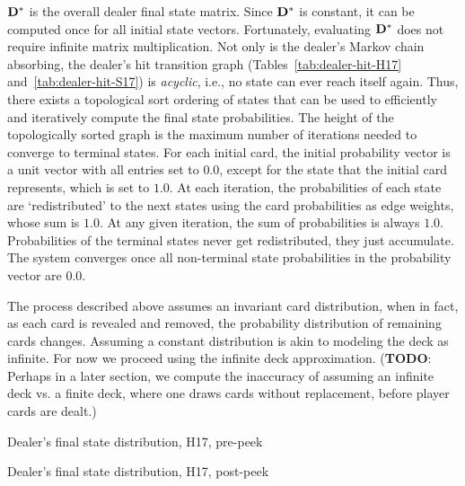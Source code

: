 
$\mathbf{D^*}$ is the overall dealer final state matrix.  
Since $\mathbf{D^*}$ is constant, it can be computed once
for all initial state vectors.
Fortunately, evaluating $\mathbf{D^*}$ does not require infinite 
matrix multiplication.
Not only is the dealer's Markov chain absorbing, 
the dealer's hit transition graph
(Tables~\ref{tab:dealer-hit-H17} and~\ref{tab:dealer-hit-S17})
is \emph{acyclic}, i.e., no state can ever reach itself again.  
Thus, there exists a topological sort
ordering of states that can be used to efficiently and iteratively 
compute the final state probabilities.
The height of the topologically sorted graph is the maximum 
number of iterations needed to converge to terminal states.
For each initial card, the initial probability vector
is a unit vector with all entries set to $0.0$, except for the state
that the initial card represents, which is set to $1.0$.
At each iteration, the probabilities of each state are 
`redistributed' to the next states using the 
card probabilities as edge weights, whose sum is $1.0$.  
At any given iteration, the sum of probabilities is always $1.0$.
Probabilities of the terminal states never get redistributed, 
they just accumulate.  
The system converges once all non-terminal state probabilities 
in the probability vector are 0.0.

The process described above assumes an invariant
card distribution, when in fact, as each card is revealed and removed, 
the probability distribution of remaining cards changes.
Assuming a constant distribution is akin to modeling
the deck as infinite.
For now we proceed using the infinite deck approximation.  
(\textbf{TODO}: Perhaps in a later section, we compute the inaccuracy of
assuming an infinite deck vs. a finite deck, where one 
draws cards without replacement, before player cards are dealt.)


\begin{table}[ht!]
\caption{Dealer's final state distribution, H17, pre-peek}
\begin{center}
{\small

}
\end{center}
\label{tab:dealer-final-H17-pre-peek}
\end{table}

\begin{table}[ht!]
\caption{Dealer's final state distribution, H17, post-peek}
\begin{center}
{\small

}
\end{center}
\label{tab:dealer-final-H17-post-peek}
\end{table}

